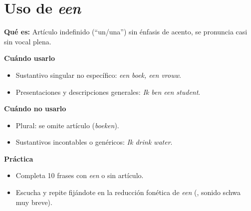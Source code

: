 \section{Uso de \textit{een}}
\textbf{Qué es:} Artículo indefinido (``un/una'') sin énfasis de acento, se pronuncia casi sin vocal plena.

\textbf{Cuándo usarlo}
\begin{itemize}[leftmargin=*]
  \item Sustantivo singular no específico: \textit{een boek, een vrouw}.
  \item Presentaciones y descripciones generales: \textit{Ik ben een student}.
\end{itemize}

\textbf{Cuándo no usarlo}
\begin{itemize}[leftmargin=*]
\item Plural: se omite artículo (\textit{boeken}).
  \item Sustantivos incontables o genéricos: \textit{Ik drink water}.
\end{itemize}

\textbf{Práctica}
\begin{itemize}[leftmargin=*]
  \item Completa 10 frases con \textit{een} o sin artículo.
  \item Escucha y repite fijándote en la reducción fonética de \textit{een} (, sonido schwa muy breve).
\end{itemize}
